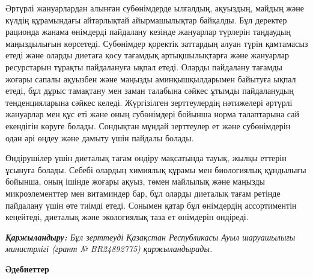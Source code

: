 \begin{multicols}{2}
Әртүрлі жануарлардан алынған субөнімдерде ылғалдың, ақуыздың, майдың
және күлдің құрамындағы айтарлықтай айырмашылықтар байқалды. Бұл
деректер рационда жанама өнімдерді пайдалану кезінде жануарлар түрлерін
таңдаудың маңыздылығын көрсетеді. Субөнімдер қоректік заттардың алуан
түрін қамтамасыз етеді және оларды диетаға қосу тағамдық артықшылықтарға
және жануарлар ресурстарын тұрақты пайдалануға ықпал етеді. Оларды
пайдалану тағамды жоғары сапалы ақуызбен және маңызды аминқышқылдарымен
байытуға ықпал етеді, бұл дұрыс тамақтану мен заман талабына сәйкес
ұтымды пайдаланудың тенденцияларына сәйкес келеді. Жүргізілген
зерттеулердің нәтижелері әртүрлі жануарлар мен құс еті және оның
субөнімдері бойынша норма талаптарына сай екендігін көруге болады.
Сондықтан мұндай зерттеулер ет және субөнімдерін одан әрі өңдеу және
дамыту үшін пайдалы болады.

Өндірушілер үшін диеталық тағам өндіру мақсатында тауық, жылқы еттерін
ұсынуға болады. Себебі олардың химиялық құрамы мен биологиялық құндылығы
бойынша, оның ішінде жоғары ақуыз, төмен майлылық және маңызды
микроэлементтер мен витаминдер бар, бұл оларды диеталық тағам ретінде
пайдалану үшін өте тиімді етеді. Сонымен қатар бұл өнімдердің
ассортиментін кеңейтеді, диеталық және экологиялық таза ет өнімдерін
өндіреді.

\emph{{\bfseries Қаржыландыру:} Бұл зерттеуді Қазақстан Республикасы Ауыл
шаруашылығы министрлігі (грант № BR24892775) қаржыландырады.}
\end{multicols}

\begin{center}
{\bfseries Әдебиеттер}
\end{center}

